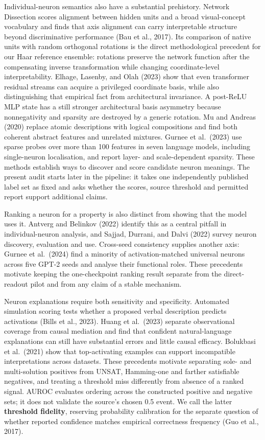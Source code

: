 \documentclass[
  british,
  11pt,
  a4paper,
]{article}
\begin{document}
Individual-neuron semantics also have a substantial prehistory. Network
Dissection scores alignment between hidden units and a broad
visual-concept vocabulary and finds that axis alignment can carry
interpretable structure beyond discriminative performance (Bau et al.,
2017). Its comparison of native units with random orthogonal rotations
is the direct methodological precedent for our Haar reference ensemble:
rotations preserve the network function after the compensating inverse
transformation while changing coordinate-level interpretability. Elhage,
Lasenby, and Olah (2023) show that even transformer residual streams can
acquire a privileged coordinate basis, while also distinguishing that
empirical fact from architectural invariance. A post-ReLU MLP state has
a still stronger architectural basis asymmetry because nonnegativity and
sparsity are destroyed by a generic rotation. Mu and Andreas (2020)
replace atomic descriptions with logical compositions and find both
coherent abstract features and unrelated mixtures. Gurnee et al.~(2023)
use sparse probes over more than 100 features in seven language models,
including single-neuron localisation, and report layer- and
scale-dependent sparsity. These methods establish ways to discover and
score candidate neuron meanings. The present audit starts later in the
pipeline: it takes one independently published label set as fixed and
asks whether the scores, source threshold and permitted report support
additional claims.

Ranking a neuron for a property is also distinct from showing that the
model uses it. Antverg and Belinkov (2022) identify this as a central
pitfall in individual-neuron analysis, and Sajjad, Durrani, and Dalvi
(2022) survey neuron discovery, evaluation and use. Cross-seed
consistency supplies another axis: Gurnee et al.~(2024) find a minority
of activation-matched universal neurons across five GPT-2 seeds and
analyse their functional roles. These precedents motivate keeping the
one-checkpoint ranking result separate from the direct-readout pilot and
from any claim of a stable mechanism.

Neuron explanations require both sensitivity and specificity. Automated
simulation scoring tests whether a proposed verbal description predicts
activations (Bills et al., 2023). Huang et al.~(2023) separate
observational coverage from causal mediation and find that confident
natural-language explanations can still have substantial errors and
little causal efficacy. Bolukbasi et al.~(2021) show that top-activating
examples can support incompatible interpretations across datasets. These
precedents motivate separating sole- and multi-solution positives from
UNSAT, Hamming-one and farther satisfiable negatives, and treating a
threshold miss differently from absence of a ranked signal. AUROC
evaluates ordering across the constructed positive and negative sets; it
does not validate the source's chosen 0.5 event. We call the latter
\textbf{threshold fidelity}, reserving probability calibration for the
separate question of whether reported confidence matches empirical
correctness frequency (Guo et al., 2017).
\end{document}
